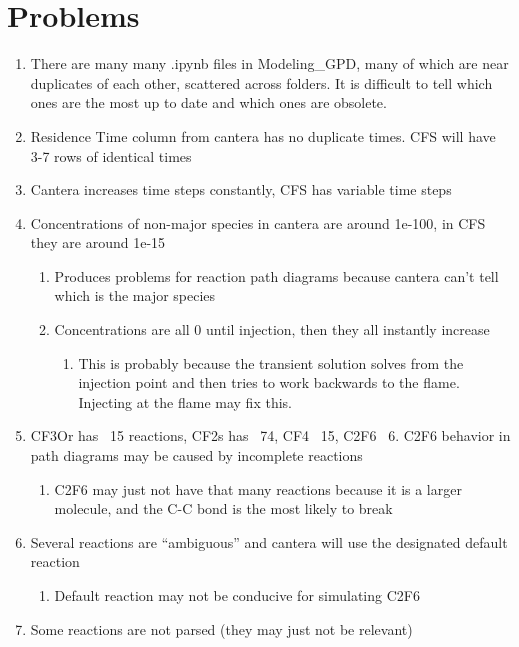 \documentclass{article}
\begin{document}
\section*{Problems}
\begin{enumerate}
    \item There are many many .ipynb files in Modeling\_GPD, many of which are near duplicates of each other, scattered across folders. It is difficult to tell which ones are the most up to date and which ones are obsolete.
    \item Residence Time column from cantera has no duplicate times. CFS will have 3-7 rows of identical times
    \item Cantera increases time steps constantly, CFS has variable time steps
    \item Concentrations of non-major species in cantera are around 1e-100, in CFS they are around 1e-15
    \begin{enumerate}
        \item Produces problems for reaction path diagrams because cantera can’t tell which is the major species
        \item Concentrations are all 0 until injection, then they all instantly increase
        \begin{enumerate}
            \item This is probably because the transient solution solves from the injection point and then tries to work backwards to the flame. Injecting at the flame may fix this.
        \end{enumerate}
    \end{enumerate}
    \item CF3Or has ~15 reactions, CF2s has ~74, CF4 ~15, C2F6 ~6. C2F6 behavior in path diagrams may be caused by incomplete reactions
    \begin{enumerate}
        \item C2F6 may just not have that many reactions because it is a larger molecule, and the C-C bond is the most likely to break
    \end{enumerate}
    \item Several reactions are “ambiguous” and cantera will use the designated default reaction
    \begin{enumerate}
        \item Default reaction may not be conducive for simulating C2F6
    \end{enumerate}
    \item Some reactions are not parsed (they may just not be relevant)
\end{enumerate}
\end{document}
